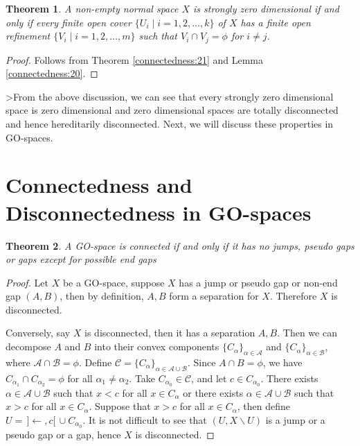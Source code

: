 \documentclass[12pt,oneside,english]{amsbook}
\numberwithin{equation}{section} %
\numberwithin{figure}{section} %
\theoremstyle{plain}
\numberwithin{section}{chapter}
\newtheorem{thm}{Theorem}[section]
\theoremstyle{plain}
\begin{document}
\begin{thm}\label{connectedness:22}
  A non-empty normal space $X$ is strongly zero dimensional if and only if every finite open cover $\{U_i \; | \; i = 1,2, \ldots , k\}$ of $X$ has a finite open refinement $\{V_i \; | \; i = 1,2, \ldots , m\}$ such that $V_i \cap V_j = \phi$ for $i \neq j$.
\end{thm}
\begin{proof}
Follows from Theorem \ref{connectedness:21} and Lemma \ref{connectedness:20}.
\end{proof}


>From the above discussion, we can see that every strongly zero dimensional space is zero dimensional and zero dimensional spaces are totally disconnected and hence hereditarily disconnected. Next, we will discuss these properties in GO-spaces.
\section{Connectedness and Disconnectedness in GO-spaces}

\begin{thm}\label{connectedness:24}
  A GO-space is connected if and only if it has no jumps, pseudo gaps or gaps except for possible end gaps
\end{thm}
\begin{proof}
  Let $X$ be a GO-space, suppose $X$ has a jump or pseudo gap or non-end gap $(A,B)$, then by definition, $A,B$ form a separation for $X$. Therefore $X$ is disconnected.
  
  Conversely, say $X$ is disconnected, then it has a separation $A,B$. Then we can decompose $A$ and $B$ into their convex components $\{C_{\alpha}\}_{\alpha \in \mathcal{A}}$ and $\{C_{\alpha}\}_{\alpha \in \mathcal{B}}$, where $\mathcal{A} \cap \mathcal{B} = \phi$. Define $\mathcal{C} = \{C_{\alpha}\}_{\alpha \in \mathcal{A} \cup \mathcal{B}}$. Since $A \cap B = \phi$, we have $C_{\alpha_{1}} \cap C_{\alpha_{2}} = \phi$ for all $\alpha_{1} \neq \alpha_{2}$. Take $C_{\alpha_{0}} \in \mathcal{C}$, and let $c \in C_{\alpha_{0}}$. There exists $\alpha \in \mathcal{A} \cup \mathcal{B}$ such that $x < c$ for all $x \in C_{\alpha}$ or there exists $\alpha \in \mathcal{A} \cup \mathcal{B}$ such that $x > c$ for all $x \in C_{\alpha}$. Suppose that $x > c$ for all $x \in C_{\alpha}$, then define $U = \, ]\leftarrow, c[ \, \cup C_{\alpha_{0}}$. It is not difficult to see that $(U, X \backslash U)$ is a jump or a pseudo gap or a gap, hence $X$ is disconnected.
\end{proof}
\end{document}
